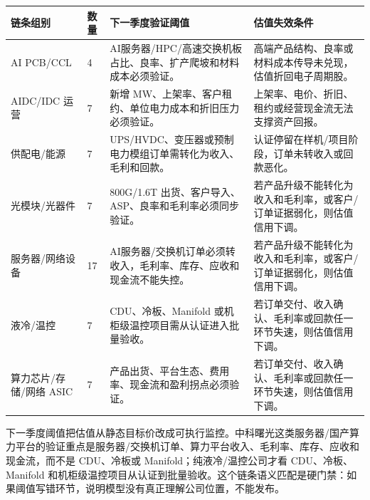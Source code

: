 \begin{exhibitbox}
\begin{tabularx}{\linewidth}{L{2.3cm}R{0.8cm}X X}
\toprule
\textbf{链条组别} & \textbf{数量} & \textbf{下一季度验证阈值} & \textbf{估值失效条件}\\
\midrule
AI PCB/CCL & 4 & AI服务器/HPC/高速交换机板占比、良率、扩产爬坡和材料成本必须验证。 & 高端产品结构、良率或材料成本传导未兑现，估值折回电子周期股。\\
AIDC/IDC 运营 & 7 & 新增 MW、上架率、客户租约、单位电力成本和折旧压力必须验证。 & 上架率、电价、折旧、租约或经营现金流无法支撑资产回报。\\
供配电/能源 & 7 & UPS/HVDC、变压器或预制电力模组订单需转化为收入、毛利和回款。 & 认证停留在样机/项目阶段，订单未转收入或回款恶化。\\
光模块/光器件 & 7 & 800G/1.6T 出货、客户导入、ASP、良率和毛利率必须同步验证。 & 若产品升级不能转化为收入和毛利率，或客户/订单证据弱化，则估值信用下调。\\
服务器/网络设备 & 17 & AI服务器/交换机订单必须转收入，毛利率、库存、应收和现金流不能失控。 & 若产品升级不能转化为收入和毛利率，或客户/订单证据弱化，则估值信用下调。\\
液冷/温控 & 7 & CDU、冷板、Manifold 或机柜级温控项目需从认证进入批量验收。 & 若订单交付、收入确认、毛利率或回款任一环节失速，则估值信用下调。\\
算力芯片/存储/网络 ASIC & 7 & 产品出货、平台生态、费用率、现金流和盈利拐点必须验证。 & 若订单交付、收入确认、毛利率或回款任一环节失速，则估值信用下调。\\
\bottomrule
\end{tabularx}
\end{exhibitbox}

下一季度阈值把估值从静态目标价改成可执行监控。中科曙光这类服务器/国产算力平台的验证重点是服务器/交换机订单、算力平台收入、毛利率、库存、应收和现金流，而不是 CDU、冷板或 Manifold；纯液冷/温控公司才看 CDU、冷板、Manifold 和机柜级温控项目从认证到批量验收。这个链条语义匹配是硬门禁：如果阈值写错环节，说明模型没有真正理解公司位置，不能发布。

